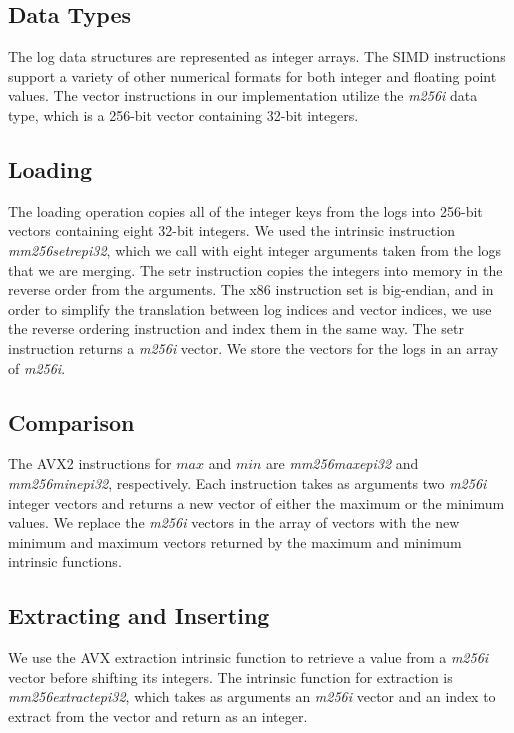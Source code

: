 \documentclass[10pt,twocolumn]{article}
\begin{document}
\subsection{Data Types}
The log data structures are represented as integer arrays.  The SIMD instructions support a variety of other numerical formats for both integer and floating point values.  The vector instructions in our implementation utilize the \textit{m256i } data type, which is a 256-bit vector containing 32-bit integers.

\subsection{Loading}
The loading operation copies all of the integer keys from the logs into 256-bit vectors containing eight 32-bit integers.  We used the intrinsic instruction \textit{mm256setrepi32}, which we call with eight integer arguments taken from the logs that we are merging.  The setr instruction copies the integers into memory in the reverse order from the arguments.  The x86 instruction set is big-endian, and in order to simplify the translation between log indices and vector indices, we use the reverse ordering instruction and index them in the same way.  The setr instruction returns a \textit{m256i } vector.  We store the vectors for the logs in an array of \textit{m256i}.

\subsection{Comparison}
The AVX2 instructions for $max$ and $min$ are \textit{mm256maxepi32} and \textit{mm256minepi32}, respectively.  Each instruction takes as arguments two \textit{m256i} integer vectors and returns a new vector of either the maximum or the minimum values.  We replace the \textit{m256i} vectors in the array of vectors with the new minimum and maximum vectors returned by the maximum and minimum intrinsic functions.

\subsection{Extracting and Inserting}
We use the AVX extraction intrinsic function to retrieve a value from a \textit{m256i} vector before shifting its integers.  The intrinsic function for extraction is \textit{mm256extractepi32}, which takes as arguments an \textit{m256i} vector and an index to extract from the vector and return as an integer.
\end{document}
